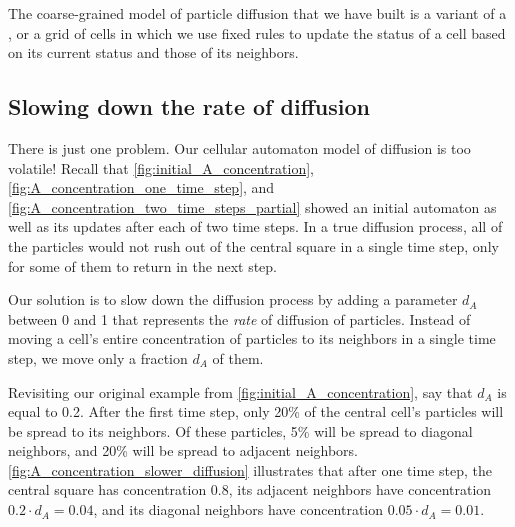The coarse-grained model of particle diffusion that we have built is a variant of a , or a grid of cells in which we use fixed rules to update the status of a cell based on its current status and those of its neighbors.\\

\begin{note}\end{note}

\FloatBarrier
{}
\subsection{Slowing down the rate of diffusion}

There is just one problem. Our cellular automaton model of diffusion is too volatile! 
Recall that \autoref{fig:initial_A_concentration}, \autoref{fig:A_concentration_one_time_step}, and
\autoref{fig:A_concentration_two_time_steps_partial} showed an initial automaton as well as its updates after each of two time steps. In a true diffusion process, all of the particles would not rush out of the central square in a single time step, only for some of them to return in the next step.

Our solution is to slow down the diffusion process by adding a parameter $d_A$ between 0 and 1 that represents the \textit{rate} of diffusion of  particles. Instead of moving a cell's entire concentration of particles to its neighbors in a single time step, we move only a fraction $d_A$ of them.

Revisiting our original example from \autoref{fig:initial_A_concentration}, say that $d_A$ is equal to 0.2. After the first time step, only 20\% of the central cell's particles will be spread to its neighbors. Of these particles, 5\% will be spread to diagonal neighbors, and 20\% will be spread to adjacent neighbors. \autoref{fig:A_concentration_slower_diffusion} illustrates that after one time step, the central square has concentration 0.8, its adjacent neighbors have concentration $0.2 \cdot d_A = 0.04$, and its diagonal neighbors have concentration $0.05 \cdot d_A = 0.01$.\\

